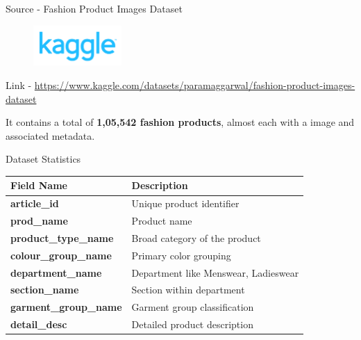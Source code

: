 \begin{frame}{Source - Fashion Product Images Dataset}
  \begin{figure}[H]
    \centering
    \includegraphics[width=0.3\textwidth]{images/kaggle.png}
  \end{figure}
  Link - \footnotesize \href{https://www.kaggle.com/datasets/paramaggarwal/fashion-product-images-dataset}{https://www.kaggle.com/datasets/paramaggarwal/fashion-product-images-dataset}\\
  \normalsize

  It contains a total of \textbf{1,05,542 fashion products}, almost each with a image and associated metadata.
\end{frame}

\begin{frame}{Dataset Statistics}
  \small

    \centering
    \renewcommand{\arraystretch}{1.2}
    \begin{tabular}{|p{}|p{}|}
    \hline
    \textbf{Field Name} & \textbf{Description} \\
    \hline
    \textbf{article\_id} & Unique product identifier \\
    \hline
    \textbf{prod\_name} & Product name \\
    \hline
    \textbf{product\_type\_name} & Broad category of the product \\
    \hline
    \textbf{colour\_group\_name} & Primary color grouping \\
    \hline
    \textbf{department\_name} & Department like Menswear, Ladieswear \\
    \hline
    \textbf{section\_name} & Section within department \\
    \hline
    \textbf{garment\_group\_name} & Garment group classification \\
    \hline
    \textbf{detail\_desc} & Detailed product description \\
    \hline
    \end{tabular}

\end{frame}